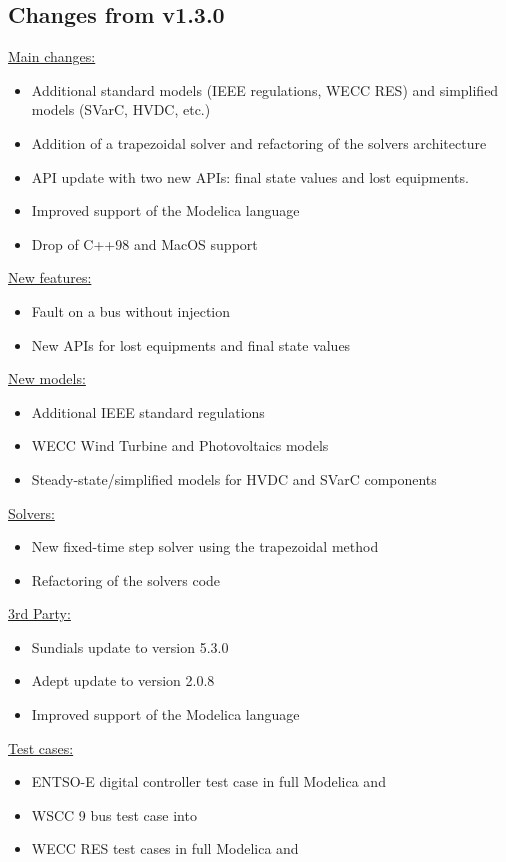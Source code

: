 \documentclass[a4paper, 12pt]{report}
\begin{document}
\subsection{Changes from v1.3.0}

\underline{Main changes:}
\begin{itemize}
\item Additional standard models (IEEE regulations, WECC RES) and simplified models (SVarC, HVDC, etc.)
\item Addition of a trapezoidal solver and refactoring of the solvers architecture
\item API update with two new APIs: final state values and lost equipments.
\item Improved support of the Modelica language
\item Drop of C++98 and MacOS support
\end{itemize}

\underline{New features:}
\begin{itemize}
\item Fault on a bus without injection
\item New APIs for lost equipments and final state values
\end{itemize}

\underline{New models:}
\begin{itemize}
\item Additional IEEE standard regulations
\item WECC Wind Turbine and Photovoltaics models
\item Steady-state/simplified models for HVDC and SVarC components
\end{itemize}

\underline{Solvers:}
\begin{itemize}
\item New fixed-time step solver using the trapezoidal method
\item Refactoring of the solvers code
\end{itemize}

\underline{3rd Party:}
\begin{itemize}
\item Sundials update to version 5.3.0
\item Adept update to version 2.0.8
\item Improved support of the Modelica language
\end{itemize}

\underline{Test cases:}
\begin{itemize}
\item ENTSO-E digital controller test case in full Modelica and \Dynawo
\item WSCC 9 bus test case into \Dynawo
\item WECC RES test cases in full Modelica and \Dynawo
\end{itemize}
\end{document}
